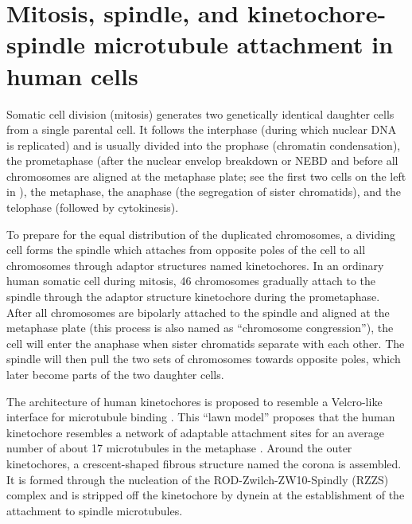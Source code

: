 \section{Mitosis, spindle, and kinetochore-spindle microtubule attachment in human cells}

Somatic cell division (mitosis) generates two genetically identical daughter cells from a single parental cell. It follows the interphase (during which nuclear DNA is replicated) and is usually divided into the prophase (chromatin condensation), the prometaphase (after the nuclear envelop breakdown or NEBD and before all chromosomes are aligned at the metaphase plate; see the first two cells on the left in ), the metaphase, the anaphase (the segregation of sister chromatids), and the telophase (followed by cytokinesis).

To prepare for the equal distribution of the duplicated chromosomes, a dividing cell forms the spindle which attaches from opposite poles of the cell to all chromosomes through adaptor structures named kinetochores. In an ordinary human somatic cell during mitosis, 46 chromosomes gradually attach to the spindle through the adaptor structure kinetochore during the prometaphase. After all chromosomes are bipolarly attached to the spindle and aligned at the metaphase plate (this process is also named as ``chromosome congression''), the cell will enter the anaphase when sister chromatids separate with each other. The spindle will then pull the two sets of chromosomes towards opposite poles, which later become parts of the two daughter cells.

The architecture of human kinetochores is proposed to resemble a Velcro-like interface for microtubule binding \cite{Velcro}. This ``lawn model'' proposes that the human kinetochore resembles a network of adaptable attachment sites for an average number of about 17 microtubules in the metaphase \cite{Wendell1993, Zaytsev2014, Zaytsev2015, Kukreja2020}. Around the outer kinetochores, a crescent-shaped fibrous structure named the corona is assembled. It is formed through the nucleation of the ROD-Zwilch-ZW10-Spindly (RZZS) complex and is stripped off the kinetochore by dynein at the establishment of the attachment to spindle microtubules.

